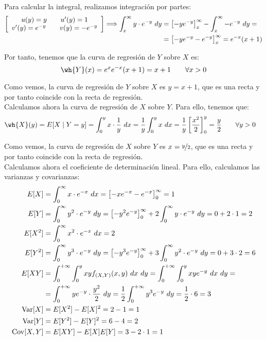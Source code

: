 \begin{ejercicio}
    Para calcular la integral, realizamos integración por partes:
    \begin{align*}
        \left[\begin{array}{c} u(y)=y\qquad u'(y)=1 \\ v'(y)=e^{-y}\qquad v(y)=-e^{-y} \end{array}\right]
        \Longrightarrow
        \int_x^{\infty} y\cdot e^{-y} \ dy &= \left[-ye^{-y}\right]_{x}^{\infty} - \int_x^{\infty} -e^{-y} \ dy
        =\\&= \left[-ye^{-y}-e^{-y}\right]_{x}^{\infty} = e^{-x}(x+1)
    \end{align*}

    Por tanto, tenemos que la curva de regresión de $Y$ sobre $X$ es:
    \begin{equation*}
        \wh{Y}(x) = e^xe^{-x}(x+1) = x+1 \qquad \forall x>0
    \end{equation*}

    Como vemos, la curva de regresión de $Y$ sobre $X$ es $y=x+1$, que es una recta y por tanto coincide con la recta de regresión.\\

    Calculamos ahora la curva de regresión de $X$ sobre $Y$. Para ello, tenemos que:
    \begin{align*}
        \wh{X}(y) &= E[X\mid Y=y] = \int_{0}^{y} x\cdot \dfrac{1}{y} \ dx = \dfrac{1}{y}\int_{0}^{y} x \ dx
        = \dfrac{1}{y}\left[\dfrac{x^2}{2}\right]_{0}^{y} = \dfrac{y}{2} \qquad \forall y>0
    \end{align*}

    Como vemos, la curva de regresión de $X$ sobre $Y$ es $x=\nicefrac{y}{2}$, que es una recta y por tanto coincide con la recta de regresión.\\

    Calculamos ahora el coeficiente de determinación lineal. Para ello, calculamos las varianzas y covarianzas:
    \begin{align*}
        E[X] &= \int_{0}^{\infty} x\cdot e^{-x} \ dx = \left[-xe^{-x}-e^{-x}\right]_{0}^{\infty} = 1\\
        E[Y] &= \int_{0}^{\infty} y^2\cdot e^{-y} \ dy = \left[-y^2e^{-y}\right]_{0}^{\infty} +2\int_{0}^{\infty} y\cdot e^{-y} \ dy = 0+2\cdot 1=2\\
        E[X^2] &= \int_{0}^{\infty} x^2\cdot e^{-x} \ dx = 2\\
        E[Y^2] &= \int_{0}^{\infty} y^3\cdot e^{-y} \ dy = \left[-y^3e^{-y}\right]_{0}^{\infty} +3\int_{0}^{\infty} y^2\cdot e^{-y} \ dy = 0+3\cdot 2=6\\
        E[XY] &= \int_0^{+\infty}\int_0^y xy f_{(X,Y)}(x,y) \ dx \ dy
        = \int_0^{+\infty}\int_0^y xy e^{-y} \ dx \ dy
        =\\&= \int_0^{+\infty}y e^{-y}\cdot \dfrac{y^2}{2} \ dy
        = \dfrac{1}{2}\int_0^{+\infty}y^3 e^{-y} \ dy
        = \dfrac{1}{2}\cdot 6 = 3\\
        \Var[X] &= E[X^2]-E[X]^2 = 2-1 = 1\\
        \Var[Y] &= E[Y^2]-E[Y]^2 = 6-4 = 2\\
        \Cov[X,Y] &= E[XY]-E[X]E[Y] = 3-2\cdot 1 = 1
    \end{align*}


\end{ejercicio}
